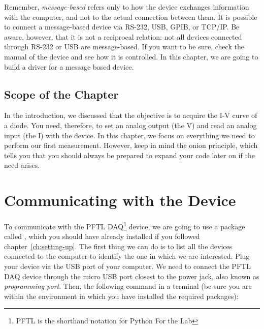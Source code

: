 
Remember, \textit{message-based} refers only to how the device exchanges information with the computer, and not to the actual connection between them. It is possible to connect a message-based device via RS-232, USB, GPIB, or TCP/IP. Be aware, however, that it is not a reciprocal relation: not all devices connected through RS-232 or USB are message-based. If you want to be sure, check the manual of the device and see how it is controlled. In this chapter, we are going to build a driver for a message based device.

\subsection{Scope of the Chapter}\label{subsec:scope-of-the-chapter}
In the introduction, we discussed that the objective is to acquire the I-V curve of a diode. You need, therefore, to set an analog output (the V) and read an analog input (the I) with the device. In this chapter, we focus
on everything we need to perform our first measurement. However, keep in mind the onion principle, which tells you that you should always be prepared to expand your code later on if the need arises.

\section{Communicating with the Device}\label{sec:message-basedevices}
To communicate with the {PFTL DAQ}\footnote{PFTL is the shorthand notation for Python For the Lab} device, we are going to use a package called , which you should have already installed if you followed chapter~\ref{ch:setting-up}. The first thing we can do is to list all the devices connected to the computer to identify the one in which we are interested. Plug your device via the USB port of your computer. We need to connect the {PFTL DAQ} device through the micro USB port closest to the power jack, also known as \emph{programming port}. Then, the following command in a terminal (be sure you are within the environment in which you have installed the required packages):

